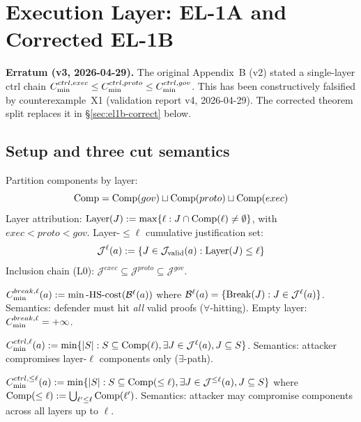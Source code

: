\section{Execution Layer: EL-1A and Corrected EL-1B}
\label{app:el}

\noindent\colorbox{yellow!30}{\parbox{\linewidth}{
  \textbf{Erratum (v3, 2026-04-29).}
  The original Appendix~B (v2) stated a single-layer ctrl chain
  $C_{\min}^{ctrl,exec}\le C_{\min}^{ctrl,proto}\le C_{\min}^{ctrl,gov}$.
  This has been constructively falsified by counterexample~X1
  (validation report v4, 2026-04-29). The corrected theorem split
  replaces it in \S\ref{sec:el1b-correct} below.
}}

\subsection{Setup and three cut semantics}

Partition components by layer:
$$\mathrm{Comp} = \mathrm{Comp}(gov) \sqcup \mathrm{Comp}(proto) \sqcup \mathrm{Comp}(exec)$$
Layer attribution: $\mathrm{Layer}(J):=\max\{\ell : J\cap\mathrm{Comp}(\ell)\ne\emptyset\}$,
with $exec < proto < gov$.
Layer-$\le\ell$ cumulative justification set:
$$\mathcal{J}^\ell(a):=\{J\in\mathcal{J}_{\mathrm{valid}}(a):\mathrm{Layer}(J)\le\ell\}$$
Inclusion chain (L0): $\mathcal{J}^{exec}\subseteq\mathcal{J}^{proto}\subseteq\mathcal{J}^{gov}$.

\begin{definition}
$C_{\min}^{break,\ell}(a) := \min\text{-HS-cost}(\mathcal{B}^\ell(a))$
where $\mathcal{B}^\ell(a)=\{\mathrm{Break}(J):J\in\mathcal{J}^\ell(a)\}$.
Semantics: defender must hit \emph{all} valid proofs ($\forall$-hitting).
Empty layer: $C_{\min}^{break,\ell}=+\infty$.
\end{definition}

\begin{definition}
$C_{\min}^{ctrl,\ell}(a):=\min\{|S|:S\subseteq\mathrm{Comp}(\ell),\exists J\in\mathcal{J}^\ell(a), J\subseteq S\}$.
Semantics: attacker compromises layer-$\ell$ components only ($\exists$-path).
\end{definition}

\begin{definition}
$C_{\min}^{ctrl,\le\ell}(a):=\min\{|S|:S\subseteq\mathrm{Comp}(\le\ell),\exists J\in\mathcal{J}^{\le\ell}(a), J\subseteq S\}$
where $\mathrm{Comp}(\le\ell):=\bigcup_{\ell'\le\ell}\mathrm{Comp}(\ell')$.
Semantics: attacker may compromise components across all layers up to $\ell$.
\end{definition}

